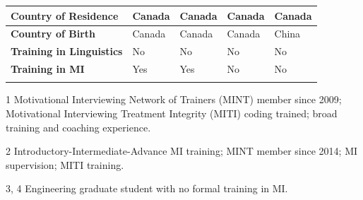 \begin{table}[!ht]
\begin{threeparttable}
\begin{tabular}{%
			@{}p{}
			p{}
			p{}
			p{}
			p{}@{}}
			\hline
			\textbf{Country of Residence}    & Canada                             & Canada    & Canada        & Canada        \\
			\hline
			\textbf{Country of Birth}        & Canada                             & Canada    & Canada        & China         \\
			\hline
			\textbf{Training in Linguistics} & No                                 & No        & No            & No            \\
			\hline
			\textbf{Training in MI}          & Yes                                & Yes       & No            & No            \\
			\arrayrulecolor{black}
			\bottomrule
		\end{tabular}

		\begin{tablenotes}
			\footnotesize
			\item[1]
			Motivational Interviewing Network of Trainers (MINT) member since 2009;
			Motivational Interviewing Treatment Integrity (MITI) coding trained; broad training
			and coaching experience.
			\item[2]
			Introductory-Intermediate-Advance MI training;
			MINT member since 2014;
			MI supervision; MITI training.
			\item[3, 4]
			Engineering graduate student with no formal training in MI.
		\end{tablenotes}

	\end{threeparttable}
\end{table}
